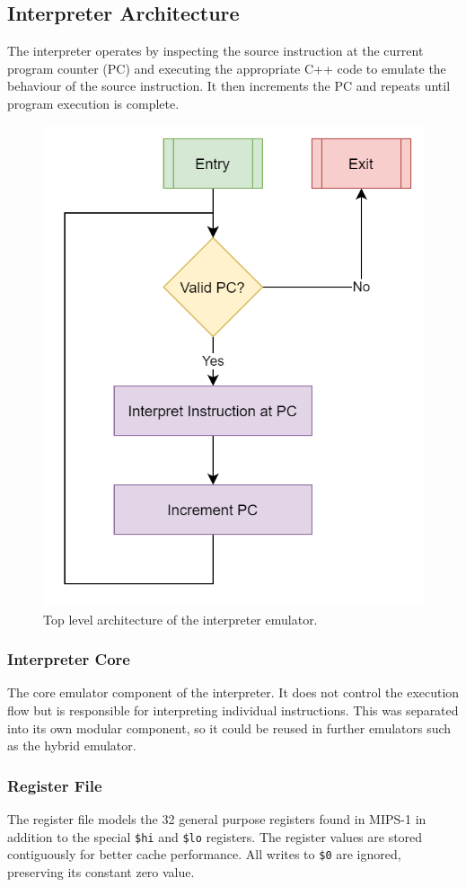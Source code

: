 \subsection{Interpreter Architecture}

The interpreter operates by inspecting the source instruction at the current program counter (PC) and executing the appropriate C++ code to emulate the behaviour of the source instruction. It then increments the PC and repeats until program execution is complete.

\begin{figure}[h]
    \centering
    \includegraphics[width=0.5\linewidth]{diagrams/interpreter.png}
    \caption{Top level architecture of the interpreter emulator.}
    \label{figure:interpreter-arch}
\end{figure}

\subsubsection{Interpreter Core}

The core emulator component of the interpreter. It does not control the execution flow but is responsible for interpreting individual instructions. This was separated into its own modular component, so it could be reused in further emulators such as the hybrid emulator.

\subsubsection{Register File}
\label{section:interpreter-reg-file}

The register file models the 32 general purpose registers found in MIPS-1 in addition to the special \texttt{\$hi} and \texttt{\$lo} registers. The register values are stored contiguously for better cache performance. All writes to \texttt{\$0} are ignored, preserving its constant zero value.

